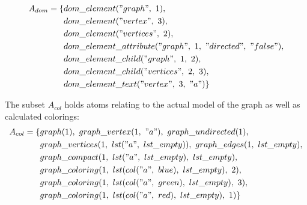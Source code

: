 \begin{example}
\begin{align*}
    A_{dom} = \{&dom\_element("graph",~1),\\
                &dom\_element("vertex",~3),\\
                &dom\_element("vertices",~2),\\
                &dom\_element\_attribute("graph",~1,~"directed",~"false"),\\
                &dom\_element\_child("graph",~1,~2),\\
                &dom\_element\_child("vertices",~2,~3),\\
                &dom\_element\_text("vertex",~3,~"a")\}
\end{align*}  

The subset $A_{col}$ holds atoms relating to the actual model of the graph as well as calculated colorings:
\begin{align*}
    A_{col} = \{&graph(1),~graph\_vertex(1,~"a"),~graph\_undirected(1),\\
                &graph\_vertices(1,~lst("a",~lst\_empty)),~graph\_edges(1,~lst\_empty),\\
                &graph\_compact(1,~lst("a",~lst\_empty),~lst\_empty),\\
                &graph\_coloring(1,~lst(col("a",~blue),~lst\_empty),~2),\\
                &graph\_coloring(1,~lst(col("a",~green),~lst\_empty),~3),\\
                &graph\_coloring(1,~lst(col("a",~red),~lst\_empty),~1)\}
\end{align*} 


\end{example}
